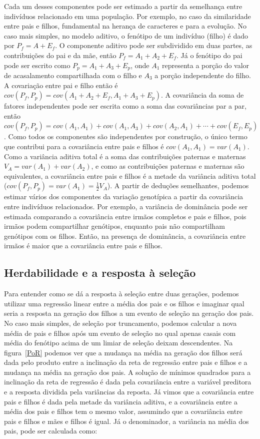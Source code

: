 \begin{refsection}
Cada um desses componentes pode ser estimado a partir da semelhança entre
indivíduos relacionado em uma população. Por exemplo, no caso da similaridade
entre pais e filhos, fundamental na herança de caracteres e para a evolução.
No caso mais simples, no modelo aditivo, o fenótipo de um indivíduo (filho) é dado por
$P_f = A + E_f$. O componente aditivo pode ser subdividido em duas partes, as
contribuições do pai e da mãe, então $P_f = A_1 + A_2 + E_f$. Já o fenótipo do pai
pode ser escrito como $P_p = A_1 + A_3 + E_p$, onde $A_1$ representa a porção
do valor de acasalamento compartilhada com o filho e $A_3$ a porção
independente do filho. A covariação entre pai e filho então é $cov(P_f, P_p) =
cov(A_1 + A_2 + E_f, A_1 + A_3 + E_p)$. A covariância da soma de fatores
independentes pode ser escrita como a soma das covariâncias par a par, então
$cov(P_f, P_p) = cov(A_1, A_1) + cov(A_1, A_3) + cov(A_2, A_1) + \cdots  +
cov(E_f, E_p)$. Como todos os componentes são independentes por construção, o
único termo que contribui para a covariância entre pais e filhos é $cov(A_1,
A_1) = var(A_1)$. Como a variância aditiva total é a soma das contribuições
paternas e maternas $V_A = var(A_1) + var(A_2)$, e como as contribuições
paternas e maternas são equivalentes, a covariância entre pais e filhos é a
metade da variância aditiva total ($cov(P_f, P_p) = var(A_1) = \frac{1}{2}V_A$).
A partir de deduções semelhantes, podemos estimar vários dos componentes da
variação genotípica a partir da covariância entre indivíduos relacionados. Por
exemplo, a variância de dominância pode ser estimada comparando a covariância
entre irmãos completos e pais e filhos, pois irmãos podem compartilhar
genótipos, enquanto pais não compartilham genótipos com os filhos. Então, na
presença de dominância, a covariância entre irmãos é maior que a covariância
entre pais e filhos.

\subsection{Herdabilidade e a resposta à seleção}

Para entender como se dá a resposta à seleção entre duas gerações, podemos
utilizar uma regressão linear entre a média dos pais e os filhos e imaginar
qual seria a resposta na geração dos filhos a um evento de seleção na geração
dos pais. No caso mais simples, de seleção por truncamento, podemos calcular a
nova média de pais e filhos após um evento de seleção no qual apenas casais
com média do fenótipo acima de um limiar de seleção deixam descendentes. Na
figura~\ref{PoR} podemos ver que a mudança na média na geração dos filhos será
dada pelo produto entre a inclinação da reta de regressão entre pais e filhos
e a mudança na média na geração dos pais. A solução de mínimos quadrados para
a inclinação da reta de regressão é dada pela covariância entre a variável
preditora e a resposta dividida pela variâncias da reposta. Já vimos que a
covariância entre pais e filhos é dada pela metade da variância aditiva, e a
covariância entre a média dos pais e filhos tem o mesmo valor, assumindo que a
covariância entre pais e filhos e mães e filhos é igual. Já o denominador, a
variância na média dos pais, pode ser calculada como:


\end{refsection}
